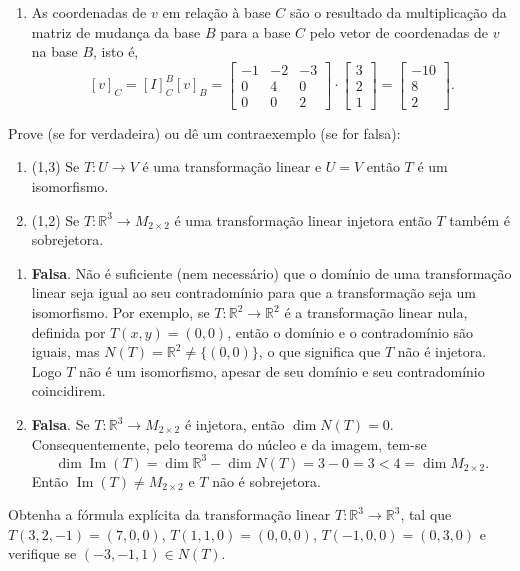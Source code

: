 \documentclass[12pt,a4paper]{article}
\newcommand*\im[1]{\operatorname{Im}\left(#1\right)}
\newcommand*\R{\mathbb{R}}
\begin{document}
\begin{ExerciseList}
\begin{enumerate}
\item As coordenadas de $v$ em relação à base $C$ são o resultado da multiplicação da matriz de mudança da base $B$ para a base $C$ pelo vetor de coordenadas de $v$ na base $B$, isto é,
\[
[v]_C
=
[I]^B_C [v]_B
=
\begin{bmatrix}
-1 & -2 & -3 \\
 0 &  4 &  0 \\
 0 &  0 &  2
\end{bmatrix}
\cdot
\begin{bmatrix}
3 \\
2 \\
1
\end{bmatrix}
=
\begin{bmatrix}
-10 \\
  8 \\
  2
\end{bmatrix}.
\]
\end{enumerate}

\Exercise[title={2,5}] Prove (se for verdadeira) ou dê um contraexemplo (se for falsa):
\begin{enumerate}
\item (1,3) Se $T: U \to V$ é uma transformação linear e $U = V$ então $T$ é um isomorfismo.
\item (1,2) Se $T: \R^3 \to M_{2 \times 2}$ é uma transformação linear injetora então $T$ também é sobrejetora.
\end{enumerate}
\Answer
\begin{enumerate}
\item \textbf{Falsa}. Não é suficiente (nem necessário) que o domínio de uma transformação linear seja igual ao seu contradomínio para que a transformação seja um isomorfismo. Por exemplo, se $T: \R^2 \to \R^2$ é a transformação linear nula, definida por $T(x,y) = (0,0)$, então o domínio e o contradomínio são iguais, mas $N(T) = \R^2 \neq \{(0,0)\}$, o que significa que $T$ não é injetora. Logo $T$ não é um isomorfismo, apesar de seu domínio e seu contradomínio coincidirem.

\item \textbf{Falsa}. Se $T: \R^3 \to M_{2 \times 2}$ é injetora, então $\dim{N(T)} = 0$. Consequentemente, pelo teorema do núcleo e da imagem, tem-se
\[
\dim{\im{T}} = \dim{\R^3} - \dim{N(T)} = 3 - 0 = 3 < 4 = \dim{M_{2 \times 2}}.
\]
Então $\im{T} \neq M_{2 \times 2}$ e $T$ não é sobrejetora.
\end{enumerate}


\Exercise[title={2,5}] Obtenha a fórmula explícita da transformação linear $T: \R^3 \to \R^3$, tal que
$T(3,2,-1) = (7,0,0)$,
$T(1,1,0) = (0,0,0)$,
$T(-1,0,0) = (0,3,0)$ e verifique se $(-3,-1,1) \in N(T)$.


\end{ExerciseList}
\end{document}
